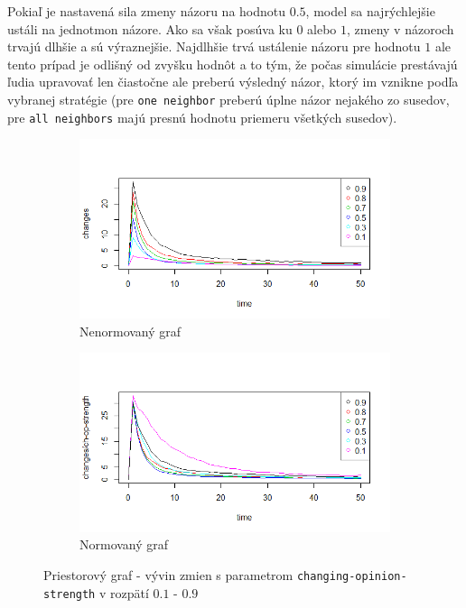 \documentclass[10pt,a4paper]{report}
\begin{document}
Pokiaľ je nastavená sila zmeny názoru na hodnotu $0.5$, model sa najrýchlejšie ustáli na jednotmon názore. Ako sa však posúva ku $0$ alebo $1$, zmeny v názoroch trvajú dlhšie a sú výraznejšie. Najdlhšie trvá ustálenie názoru pre hodnotu $1$ ale tento prípad je odlišný od zvyšku hodnôt a to tým, že počas simulácie prestávajú ľudia upravovať len čiastočne ale preberú výsledný názor, ktorý im vznikne podľa vybranej stratégie (pre \texttt{one neighbor} preberú úplne názor nejakého zo susedov, pre \texttt{all neighbors} majú presnú hodnotu priemeru všetkých susedov). 

\begin{figure}
\begin{subfigure}{.5\textwidth}
  \centering
  \includegraphics[width=1\linewidth]{plots/spatial-g/spatialChanges1-9.png}
  \caption{Nenormovaný graf}
  \label{fig:sfig1}
\end{subfigure}%
\begin{subfigure}{.5\textwidth}
  \centering
  
  \includegraphics[width=1\linewidth]{plots/spatial-g/spatialChanges1-9norm.png}
  \caption{Normovaný graf}
  \label{fig:sfig2}
\end{subfigure}
\caption{Priestorový graf - vývin zmien s parametrom \texttt{changing-opinion-strength} v rozpätí $0.1$ - $0.9$}
\label{fig:fig}
\end{figure}
\end{document}
